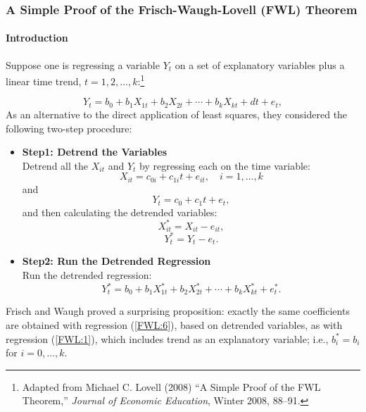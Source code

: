 \documentclass[a4paper, 10pt]{article}
\theoremstyle{definition}	%
\begin{document}
\subsubsection{A Simple Proof of the Frisch-Waugh-Lovell (FWL) Theorem } 

\paragraph{Introduction}
Suppose one is regressing a variable $Y_t$ on a set of explanatory variables plus a linear time trend, $t = 1, 2, \ldots, k$:\footnote{Adapted from Michael C. Lovell (2008) ``A Simple Proof of the FWL Theorem,'' \textit{Journal of Economic Education}, Winter 2008, 88--91.}

\begin{equation}
Y_t = b_0 + b_1 X_{1t} + b_2 X_{2t} + \cdots + b_k X_{kt} + d t + e_t,
\end{equation}
As an alternative to the direct application of least squares, they considered the following two-step procedure:
\begin{itemize}[ ]
    \item \textbf{Step1: Detrend the Variables}\\
    Detrend all the $X_{it}$ and $Y_t$ by regressing each on the time variable:
    \begin{equation}
    X_{it} = c_{0i} + c_{1i} t + e_{it}, \quad i = 1, \ldots, k \label{FWL:1}
    \end{equation} 
    and 
    \begin{equation}
    Y_t = c_0 + c_1 t + e_{t},
    \end{equation}
    and then calculating the detrended variables:
    \begin{equation}
    X^*_{it} = X_{it} - e_{it},
    \end{equation}
    \begin{equation}
    Y^*_{t} = Y_{t} - e_{t}.
    \end{equation}
    \item \textbf{Step2: Run the Detrended Regression}\\
    Run the detrended regression:
    \begin{equation}
    Y^*_{t} = b_0 + b_1 X^*_{1t} + b_2 X^*_{2t} + \cdots + b_k X^*_{kt} + e^*_t. \label{FWL:6}
    \end{equation} 
\end{itemize}
Frisch and Waugh proved a surprising proposition: exactly the same coefficients are obtained with regression (\ref{FWL:6}), based on detrended variables, as with regression (\ref{FWL:1}), which includes trend as an explanatory variable; i.e., $b_i^* = b_i$ for $i = 0, \ldots, k$.
\end{document}
